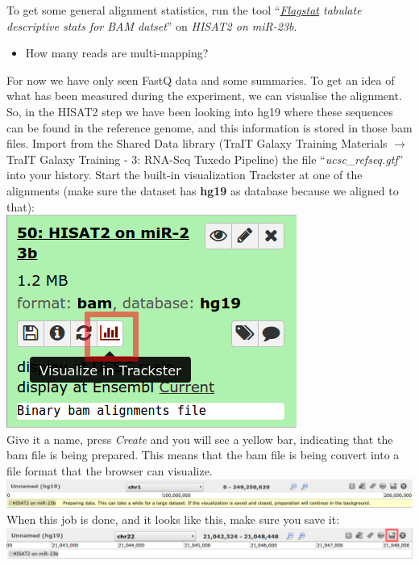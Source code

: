 \documentclass[11pt,a4paper]{article}
\begin{document}
To get some general alignment statistics, run the tool ``\textit{\underline{Flagstat} tabulate descriptive stats for BAM datset}'' on \textit{HISAT2 on miR-23b}.
\begin{itemize}
	\item How many reads are multi-mapping?
\end{itemize}
For now we have only seen FastQ data and some summaries. To get an idea of what has been measured during the experiment, we can visualise the alignment. So, in the HISAT2 step we have been looking into hg19 where these sequences can be found in the reference genome, and this information is stored in those bam files. Import from the Shared Data library (TraIT Galaxy Training Materials $\rightarrow$ TraIT Galaxy Training - 3: RNA-Seq Tuxedo Pipeline) the file ``\textit{ucsc\_refseq.gtf}'' into your history. Start the built-in visualization Trackster at one of the alignments (make sure the dataset has \textbf{hg19} as database because we aligned to that):\\
\includegraphics[scale=0.55]{figures/alignment_03}\\
Give it a name, press \textit{Create} and you will see a yellow bar, indicating that the bam file is being prepared. This means that the bam file is being convert into a file format that the browser can visualize. \includegraphics[width=\textwidth]{figures/alignment_04.png}\\
When this job is done, and it looks like this, make sure you save it:\\
\includegraphics[width=\textwidth]{figures/alignment_05.png}\\
\end{document}
